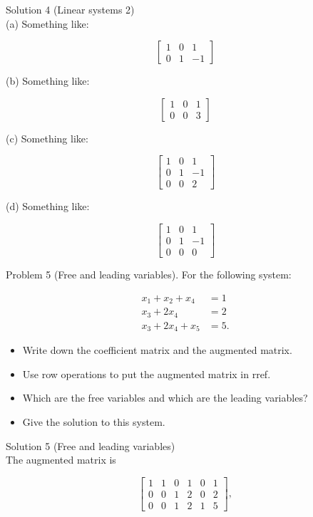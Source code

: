 \documentclass[10pt]{article}
\begin{document}
Solution 4 (Linear systems 2)\\
(a) Something like:

$$
\left[\begin{array}{cc|c}
1 & 0 & 1 \\
0 & 1 & -1
\end{array}\right]
$$

(b) Something like:

$$
\left[\begin{array}{ll|l}
1 & 0 & 1 \\
0 & 0 & 3
\end{array}\right]
$$

(c) Something like:

$$
\left[\begin{array}{cc|c}
1 & 0 & 1 \\
0 & 1 & -1 \\
0 & 0 & 2
\end{array}\right]
$$

(d) Something like:

$$
\left[\begin{array}{cc|c}
1 & 0 & 1 \\
0 & 1 & -1 \\
0 & 0 & 0
\end{array}\right]
$$

Problem 5 (Free and leading variables). For the following system:

$$
\begin{aligned}
x_{1}+x_{2}+x_{4} & =1 \\
x_{3}+2 x_{4} & =2 \\
x_{3}+2 x_{4}+x_{5} & =5 .
\end{aligned}
$$

\begin{itemize}
  \item Write down the coefficient matrix and the augmented matrix.
  \item Use row operations to put the augmented matrix in rref.
  \item Which are the free variables and which are the leading variables?
  \item Give the solution to this system.
\end{itemize}

Solution 5 (Free and leading variables)\\
The augmented matrix is

$$
\left[\begin{array}{lllll|l}
1 & 1 & 0 & 1 & 0 & 1 \\
0 & 0 & 1 & 2 & 0 & 2 \\
0 & 0 & 1 & 2 & 1 & 5
\end{array}\right],
$$
\end{document}
